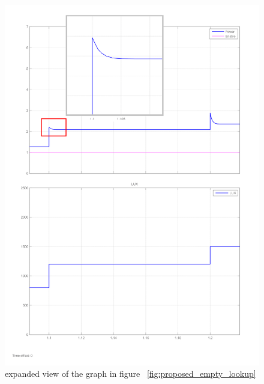  \begin{figure}[H]
  \begin{center}
  \includegraphics[width=\textwidth]{images/proposed_step_input_zoom-1(2)_pip}
  \caption{ expanded view of the graph in figure ~\ref{fig:proposed_empty_lookup}}
  \label{fig:fig:Zoom_proposed_empty_lookup}
  \end{center}
  \end{figure}

